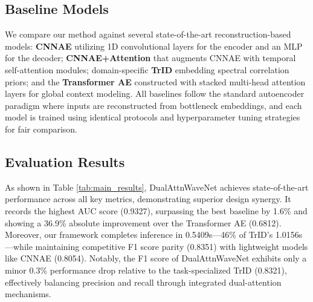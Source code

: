 \documentclass[conference]{IEEEtran}
\begin{document}


\subsection{Baseline Models}

We compare our method against several state-of-the-art reconstruction-based models: \textbf{CNNAE} utilizing 1D convolutional layers for the encoder and an MLP for the decoder; \textbf{CNNAE+Attention} that augments CNNAE with temporal self-attention modules; domain-specific \textbf{TrID} embedding spectral correlation priors; and the \textbf{Transformer AE} constructed with stacked multi-head attention layers for global context modeling. All baselines follow the standard autoencoder paradigm where inputs are reconstructed from bottleneck embeddings, and each model is trained using identical protocols and hyperparameter tuning strategies for fair comparison.

\subsection{Evaluation Results}

As shown in Table \ref{tab:main_results}, DualAttnWaveNet achieves state-of-the-art performance across all key metrics, demonstrating superior design synergy. It records the highest AUC score (0.9327), surpassing the best baseline by 1.6\% and showing a 36.9\% absolute improvement over the Transformer AE (0.6812). Moreover, our framework completes inference in 0.5409s—46\% of TrID's 1.0156s—while maintaining competitive F1 score parity (0.8351) with lightweight models like CNNAE (0.8054). Notably, the F1 score of DualAttnWaveNet exhibits only a minor 0.3\% performance drop relative to the task-specialized TrID (0.8321), effectively balancing precision and recall through integrated dual-attention mechanisms.
\end{document}
